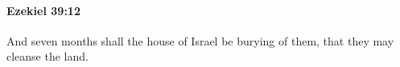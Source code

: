 
		\paragraph{Ezekiel 39:12} %
			\label{EZEKIEL-39-12}

			And seven months shall the house of Israel be burying of them, that they may cleanse the land.


